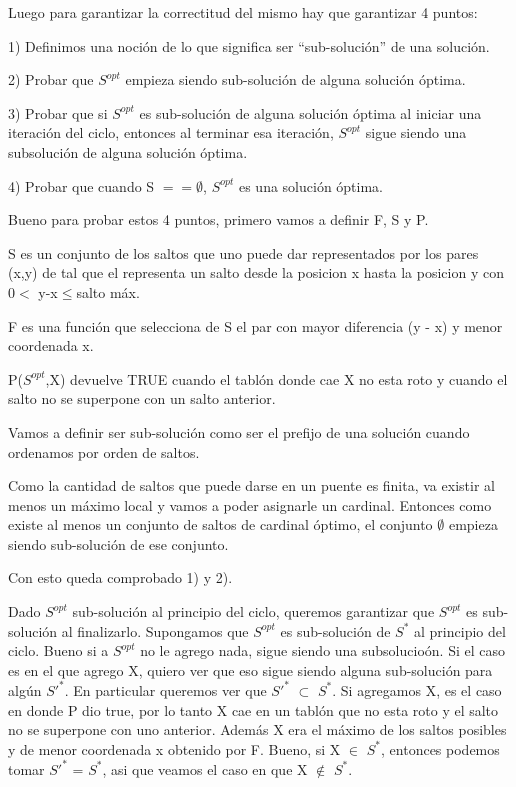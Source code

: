 Luego para garantizar la correctitud del mismo hay que garantizar 4 puntos:


1) Definimos una noci\'on de lo que significa ser “sub-soluci\'on” de una soluci\'on.

2) Probar que $S^{opt}$ empieza siendo sub-soluci\'on de alguna soluci\'on \'optima.

3) Probar que si  $S^{opt}$ es sub-soluci\'on de alguna soluci\'on \'optima al iniciar 	una iteraci\'on del ciclo, entonces al terminar  esa iteraci\'on, $S^{opt}$ sigue siendo una subsoluci\'on de alguna soluci\'on \'optima.

4) Probar que cuando S $== \emptyset$, $S^{opt}$ es una soluci\'on \'optima.

Bueno para probar estos 4 puntos, primero vamos a definir F, S y P.


S es un conjunto de los saltos que uno puede dar representados por los pares (x,y) de tal que el representa un salto desde la posicion x hasta la posicion y con 0$<$ y-x$\leq$salto m\'ax.

F es una funci\'on que selecciona de S el par con mayor diferencia (y - x) y menor coordenada x.

P($S^{opt}$,X) devuelve TRUE cuando el tabl\'on donde cae X no esta roto y cuando el salto no se superpone con un salto anterior.

Vamos a definir ser sub-soluci\'on como ser el prefijo de una soluci\'on cuando ordenamos por orden de saltos.

Como la cantidad de saltos que puede darse en un puente es finita, va existir al menos un m\'aximo local y vamos a poder asignarle un cardinal. Entonces como existe al menos un conjunto de saltos de cardinal \'optimo, el conjunto $\emptyset$ empieza siendo sub-soluci\'on de ese conjunto.

Con esto queda comprobado 1) y 2).

Dado $S^{opt}$ sub-soluci\'on al principio del ciclo, queremos garantizar que $S^{opt}$ es sub-soluci\'on al finalizarlo.
Supongamos que $S^{opt}$ es sub-soluci\'on de $S^{*}$ al principio del ciclo.
Bueno si a $S^{opt}$ no le agrego nada, sigue siendo una subsolucio\'on.
Si el caso es en el que agrego X, quiero ver que eso sigue siendo alguna sub-soluci\'on para alg\'un $S'^{*}$. En particular queremos ver que $S'^{*}$ $\subset$ $S^{*}$. 
Si agregamos X, es el caso en donde P dio true, por lo tanto X cae en un tabl\'on que no esta roto y el salto no se superpone con uno anterior.
Adem\'as X era el m\'aximo de los saltos posibles y de menor coordenada x obtenido por F.
Bueno, si X $\in$ $S^{*}$, entonces podemos tomar $S'^{*}$ = $S^{*}$, asi que veamos el caso en que X $\notin$ $S^{*}$.


